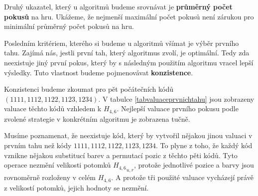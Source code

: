 Druhý ukazatel, který u algoritmů budeme srovnávat je \textbf{průměrný počet pokusů} na hru. Ukážeme, že nejmenší maximální počet pokusů není zárukou pro minimální průměrný počet pokusů na hru. 

Posledním kritériem, kterého si budeme u algoritmů všímat je výběr prvního tahu. Zajímá nás, jestli první tah, který algoritmus zvolí, je optimální. Tedy zda neexistuje jiný první pokus, který by s následným použitím algoritmu vracel lepší výsledky. Tuto vlastnost budeme pojmenovávat \textbf{konzistence}.

Konzistenci budeme zkoumat pro pět počátečních kódů $(1111, 1112, 1122, 1123, 1234)$.
V tabulce \ref{tabvaluaceprvnichtahu} jsou zobrazeny valuace těchto kódů vzhledem k $H_{4,6}$. Nejlepší valuace prvního pokusu podle zvolené strategie v konkrétním algoritmu je zobrazena tučně. 

Musíme poznamenat, že neexistuje kód, který by vytvořil nějakou jinou valuaci v prvním tahu než kódy $1111, 1112, 1122, 1123, 1234$. To plyne z toho, že každý kód vznikne nějakou substitucí barev a permutací pozic z těchto pěti kódů. Tyto operace nezmění velikosti potomků ${H_{4,6}}_{u,r}$, protože jednotlivé pozice a barvy jsou rovnoměrně rozloženy v celém $H_{4,6}$. A protože tři použité valuace vycházejí právě z velikostí potomků, jejich hodnoty se nezmění. 

